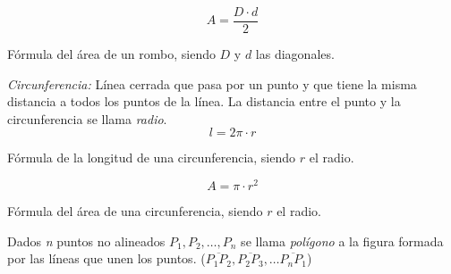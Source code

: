 $$\boxed{A = \frac{D \cdot d}{2}}$$
\begin{center}
    Fórmula del área de un rombo, siendo $D$ y $d$ las diagonales.
\end{center}

\emph{Circunferencia:} Línea cerrada que pasa por un punto y que tiene la misma distancia a todos los puntos de la línea. La distancia entre el punto y la circunferencia se llama \emph{radio}.\\


$$\boxed{l = 2 \pi \cdot r }$$
\begin{center}
    Fórmula de la longitud de una circunferencia, siendo $r$ el radio.
\end{center}

$$\boxed{A = \pi \cdot r^2}$$
\begin{center}
    Fórmula del área de una circunferencia, siendo $r$ el radio.
\end{center}


\begin{center}
\end{center}

Dados \emph{n} puntos no alineados $P_1, P_2, \dots, P_n$ se llama \emph{polígono} a la figura formada por las líneas que unen los puntos. ($\overline{P_1 P_2},\overline{P_2 P_3}, \dots \overline{P_n P_1} $)\\

